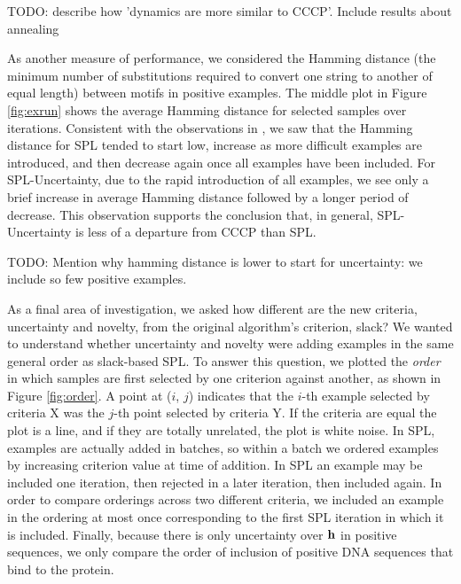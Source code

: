 \documentclass{article}
\begin{document}
TODO: describe how 'dynamics are more similar to CCCP'.  Include results about annealing

As another measure of performance, we considered the Hamming distance (the minimum number of substitutions required to convert one string to another of equal length) between motifs in positive examples. The middle plot in Figure \ref{fig:exrun} shows the average Hamming distance for selected samples over iterations. Consistent with the observations in \cite{SPL}, we saw that the Hamming distance for SPL tended to start low, increase as more difficult examples are introduced, and then decrease again once all examples have been included. For SPL-Uncertainty, due to the rapid introduction of all examples, we see only a brief increase in average Hamming distance followed by a longer period of decrease. This observation supports the conclusion that, in general, SPL-Uncertainty is less of a departure from CCCP than SPL. 

TODO: Mention why hamming distance is lower to start for uncertainty: we include so few positive examples.  


As a final area of investigation, we asked how different are the new criteria, uncertainty and novelty, from the original algorithm's criterion, slack? We wanted to understand whether uncertainty and novelty were adding examples in the same general order as slack-based SPL. To answer this question, we plotted the \emph{order} in which samples are first selected by one criterion against another, as shown in Figure \ref{fig:order}. A point at ($i$, $j$) indicates that the $i$-th example selected by criteria {\sc X} was the $j$-th point selected by criteria {\sc Y}.  If the criteria are equal the plot is a line, and if they are totally unrelated, the plot is white noise.  In SPL, examples are actually added in batches, so within a batch we ordered examples by increasing criterion value at time of addition.  In SPL an example may be included one iteration, then rejected in a later iteration, then included again.  In order to compare orderings across two different criteria, we included an example in the ordering at most once corresponding to the first SPL iteration in which it is included.  Finally, because there is only uncertainty over $\bf h$ in positive sequences, we only compare the order of inclusion of positive DNA sequences that bind to the protein.
\end{document}
